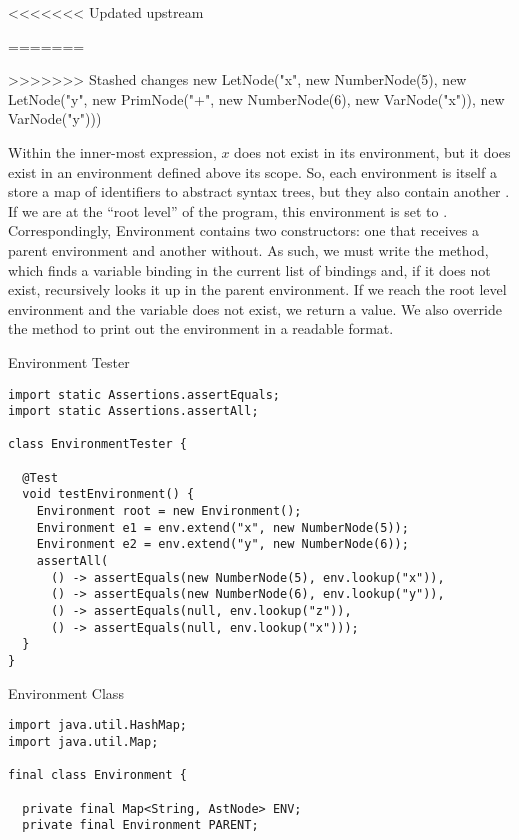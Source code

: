 <<<<<<< Updated upstream
\begin{verbnobox}[\footnotesize]
=======
\begin{verbnobox}[\small]
>>>>>>> Stashed changes
new LetNode("x", new NumberNode(5), 
 new LetNode("y", new PrimNode("+", new NumberNode(6), new VarNode("x")), 
  new VarNode("y")))
\end{verbnobox}
  
Within the inner-most  expression, $x$ does not exist in its environment, but it does exist in an environment defined above its scope. So, each environment is itself a store a map of identifiers to abstract syntax trees, but they also contain another . If we are at the ``root level'' of the program, this environment is set to . Correspondingly, Environment contains two constructors: one that receives a parent environment and another without. As such, we must write the  method, which finds a variable binding in the current list of bindings and, if it does not exist, recursively looks it up in the parent environment. If we reach the root level environment and the variable does not exist, we return a  value. We also override the  method to print out the environment in a readable format.

\begin{cl}[]{Environment Tester}
\begin{lstlisting}[language=MyJava]
import static Assertions.assertEquals;
import static Assertions.assertAll;

class EnvironmentTester {
  
  @Test
  void testEnvironment() {
    Environment root = new Environment();
    Environment e1 = env.extend("x", new NumberNode(5));
    Environment e2 = env.extend("y", new NumberNode(6));
    assertAll(
      () -> assertEquals(new NumberNode(5), env.lookup("x")),
      () -> assertEquals(new NumberNode(6), env.lookup("y")),
      () -> assertEquals(null, env.lookup("z")),
      () -> assertEquals(null, env.lookup("x")));
  }
}
\end{lstlisting}
\end{cl}
  
\begin{cl}[]{Environment Class}
\begin{lstlisting}[language=MyJava]
import java.util.HashMap;
import java.util.Map;

final class Environment {

  private final Map<String, AstNode> ENV;
  private final Environment PARENT;


\end{lstlisting}
\end{cl}
\end{verbnobox}
